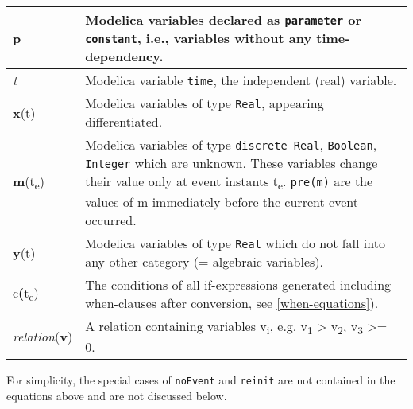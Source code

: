 \begin{longtable}[]{|p{2cm}|p{12cm}|}
\hline \endhead
\textbf{p} & Modelica variables declared as \lstinline!parameter! or
\lstinline!constant!, i.e., variables without any
time-dependency.\\ \hline
\emph{t} & Modelica variable \lstinline!time!, the independent (real)
variable.\\ \hline
\textbf{x}(t) & Modelica variables of type \lstinline!Real!, appearing
differentiated.\\ \hline
\textbf{m}(t\textsubscript{e}) & Modelica variables of type
\lstinline!discrete Real!, \lstinline!Boolean!, \lstinline!Integer! which are unknown. These
variables change their value only at event instants t\textsubscript{e}.
\lstinline!pre(m)! are the values of m immediately before the current event
occurred.\\ \hline
\textbf{y}(t) & Modelica variables of type \lstinline!Real! which do not fall
into any other category (= algebraic variables).\\ \hline
c\textbf{(}t\textsubscript{e}) & The conditions of all if-expressions
generated including when-clauses after conversion, see \autoref{when-equations}).\\ \hline
\emph{relation}(\textbf{v}) & A relation containing variables
v\textsubscript{i}, e.g. v\textsubscript{1} \textgreater{}
v\textsubscript{2}, v\textsubscript{3} \textgreater{}= 0.\\ \hline

\end{longtable}

For simplicity, the special cases of \lstinline!noEvent! and \lstinline!reinit! are not contained in the equations
above and are not discussed below.

